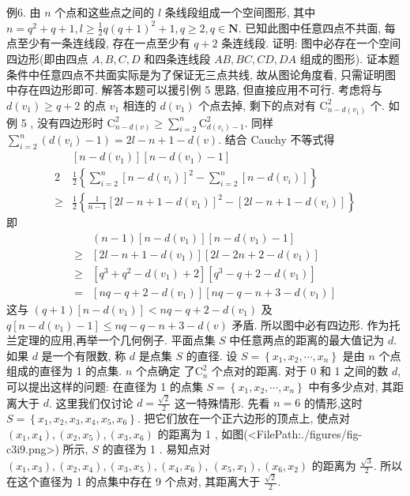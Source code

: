 例6. 由 $n$ 个点和这些点之间的 $l$ 条线段组成一个空间图形, 其中 $n= q^2+q+1, l \geqslant \frac{1}{2} q(q+1)^2+1, q \geqslant 2, q \in \mathbf{N}$.
已知此图中任意四点不共面, 每点至少有一条连线段, 存在一点至少有 $q+2$ 条连线段.
证明: 图中必存在一个空间四边形(即由四点 $A, B, C, D$ 和四条连线段 $A B, B C, C D, D A$ 组成的图形).
证本题条件中任意四点不共面实际是为了保证无三点共线, 故从图论角度看, 只需证明图中存在四边形即可.
解答本题可以援引例 5 思路, 但直接应用不可行.
考虑将与 $d\left(v_1\right) \geqslant q+2$ 的点 $v_1$ 相连的 $d\left(v_1\right)$ 个点去掉, 剩下的点对有 $\mathrm{C}_{n-d\left(v_1\right)}^2$ 个.
如例 5 , 没有四边形时 $\mathrm{C}_{n-d(v)}^2 \geqslant \sum_{i=2}^n \mathrm{C}_{d\left(v_i\right)-1}^2$.
同样 $\sum_{i=2}^n\left(d\left(v_i\right)-1\right)=2 l-n+1-d(v)$.
结合 Cauchy 不等式得
$$
\begin{aligned}
& {\left[n-d\left(v_1\right)\right]\left[n-d\left(v_1\right)-1\right] } \\
2 & \frac{1}{2}\left\{\sum_{i=2}^n\left[n-d\left(v_i\right)\right]^2-\sum_{i=2}^n\left[n-d\left(v_i\right)\right]\right\} \\
\geqslant & \frac{1}{2}\left\{\frac{1}{n-1}\left[2 l-n+1-d\left(v_1\right)\right]^2-\left[2 l-n+1-d\left(v_i\right)\right]\right\}
\end{aligned}
$$
即
$$
\begin{aligned}
& (n-1)\left[n-d\left(v_1\right)\right]\left[n-d\left(v_1\right)-1\right] \\
\geqslant & {\left[2 l-n+1-d\left(v_1\right)\right]\left[2 l-2 n+2-d\left(v_1\right)\right] } \\
\geqslant & {\left[q^3+q^2-d\left(v_1\right)+2\right]\left[q^3-q+2-d\left(v_1\right)\right] } \\
= & {\left[n q-q+2-d\left(v_1\right)\right]\left[n q-q-n+3-d\left(v_1\right)\right] }
\end{aligned}
$$
这与 $(q+1)\left[n-d\left(v_1\right)\right]<n q-q+2-d\left(v_1\right)$ 及 $q\left[n-d\left(v_1\right)-1\right] \leqslant n q- q-n+3-d(v)$ 矛盾.
所以图中必有四边形.
作为托兰定理的应用,再举一个几何例子.
平面点集 $S$ 中任意两点的距离的最大值记为 $d$. 如果 $d$ 是一个有限数, 称 $d$ 是点集 $S$ 的直径.
设 $S=\left\{x_1, x_2, \cdots, x_n\right\}$ 是由 $n$ 个点组成的直径为 1 的点集.
$n$ 个点确定 $了 \mathrm{C}_n^2$ 个点对的距离.
对于 0 和 1 之间的数 $d$, 可以提出这样的问题: 在直径为 1 的点集 $S=\left\{x_1, x_2, \cdots, x_n\right\}$ 中有多少点对, 其距离大于 $d$. 这里我们仅讨论 $d=\frac{\sqrt{2}}{2}$ 这一特殊情形.
先看 $n=6$ 的情形,这时 $S=\left\{x_1, x_2, x_3, x_4, x_5, x_6\right\}$. 把它们放在一个正六边形的顶点上, 使点对 $\left(x_1, x_4\right),\left(x_2, x_5\right),\left(x_3, x_6\right)$ 的距离为 1 , 如图(<FilePath:./figures/fig-c3i9.png>) 所示, $S$ 的直径为 1 . 易知点对 $\left(x_1, x_3\right),\left(x_2, x_4\right),\left(x_3, x_5\right),\left(x_4, x_6\right)$, $\left(x_5, x_1\right),\left(x_6, x_2\right)$ 的距离为 $\frac{\sqrt{3}}{2}$. 所以在这个直径为 1 的点集中存在 9 个点对, 其距离大于 $\frac{\sqrt{2}}{2}$.
